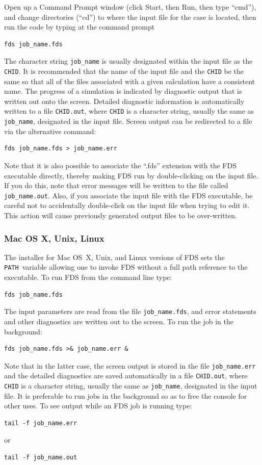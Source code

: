 \documentclass[11pt]{book}
\newcommand{\ct}{\tt\small}
\begin{document}
Open up a Command Prompt window (click Start, then Run, then type ``cmd''), and change directories (``cd'') to where the
input file for the case is located, then run the code by typing at the command prompt
\begin{verbatim}
fds job_name.fds
\end{verbatim}
The character string {\ct job\_name} is usually designated within
the input file as the {\ct CHID}. It is recommended that the name
of the input file and the {\ct CHID} be the same so that all of
the files associated with a given calculation have a consistent
name.  The progress of a simulation is indicated by diagnostic
output that is written out onto the screen. Detailed diagnostic
information is automatically written to a file {\ct CHID.out},
where {\ct CHID} is a character string, usually the same as {\ct
job\_name}, designated in the input file. Screen output can be
redirected to a file via the alternative command:
\small\begin{verbatim}
fds job_name.fds > job_name.err
\end{verbatim}\normalsize
Note that it is also possible to associate the ``.fds'' extension with the FDS executable directly, thereby making FDS run by
double-clicking on the input file. If you do this, note that error messages will be written to the file called {\ct job\_name.out}. Also, if you
associate the input file with the FDS executable, be careful not to accidentally double-click on the input file when trying to edit it.
This action will cause previously generated output files to be over-written.



\subsubsection{Mac OS X, Unix, Linux}

The installer for Mac OS~X, Unix, and Linux versions of FDS sets
the {\ct PATH}\ variable allowing one to invoke FDS without a full
path reference to the executable.  To run FDS from the command
line type:
\small\begin{verbatim}
fds job_name.fds
\end{verbatim}\normalsize
The input parameters are read from the file {\ct job\_name.fds},
and error statements and other diagnostics are written out to the
screen. To run the job in the background:
\small\begin{verbatim}
fds job_name.fds >& job_name.err &
\end{verbatim}\normalsize
Note that in the latter case, the screen output is stored in the
file {\ct job\_name.err} and the detailed diagnostics are saved
automatically in a file {\ct CHID.out}, where {\ct CHID} is a
character string, usually the same as {\ct job\_name}, designated
in the input file. It is preferable to run jobs in the background
so as to free the console for other uses. To see output while an
FDS job is running type:
\small\begin{verbatim}
tail -f job_name.err
\end{verbatim}\normalsize
or
\small\begin{verbatim}
tail -f job_name.out
\end{verbatim}\normalsize
\end{document}
